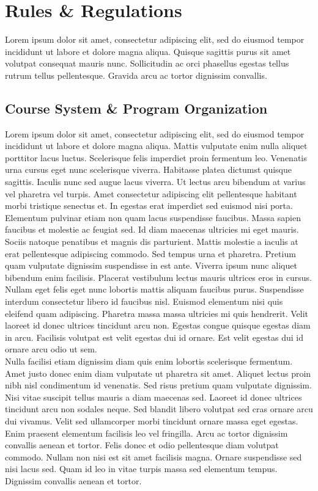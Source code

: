 \documentclass{article}
\begin{document}
\section{Rules \& Regulations}
Lorem ipsum dolor sit amet, consectetur adipiscing elit, sed do eiusmod tempor incididunt ut labore et dolore magna aliqua. Quisque sagittis purus sit amet volutpat consequat mauris nunc. Sollicitudin ac orci phasellus egestas tellus rutrum tellus pellentesque. Gravida arcu ac tortor dignissim convallis.
\subsection{Course System \& Program Organization}
Lorem ipsum dolor sit amet, consectetur adipiscing elit, sed do eiusmod tempor incididunt ut labore et dolore magna aliqua. Mattis vulputate enim nulla aliquet porttitor lacus luctus. Scelerisque felis imperdiet proin fermentum leo. Venenatis urna cursus eget nunc scelerisque viverra. Habitasse platea dictumst quisque sagittis. Iaculis nunc sed augue lacus viverra. Ut lectus arcu bibendum at varius vel pharetra vel turpis. Amet consectetur adipiscing elit pellentesque habitant morbi tristique senectus et. In egestas erat imperdiet sed euismod nisi porta. Elementum pulvinar etiam non quam lacus suspendisse faucibus. Massa sapien faucibus et molestie ac feugiat sed. Id diam maecenas ultricies mi eget mauris.\\

Sociis natoque penatibus et magnis dis parturient. Mattis molestie a iaculis at erat pellentesque adipiscing commodo. Sed tempus urna et pharetra. Pretium quam vulputate dignissim suspendisse in est ante. Viverra ipsum nunc aliquet bibendum enim facilisis. Placerat vestibulum lectus mauris ultrices eros in cursus. Nullam eget felis eget nunc lobortis mattis aliquam faucibus purus. Suspendisse interdum consectetur libero id faucibus nisl. Euismod elementum nisi quis eleifend quam adipiscing. Pharetra massa massa ultricies mi quis hendrerit. Velit laoreet id donec ultrices tincidunt arcu non. Egestas congue quisque egestas diam in arcu. Facilisis volutpat est velit egestas dui id ornare. Est velit egestas dui id ornare arcu odio ut sem.\\

Nulla facilisi etiam dignissim diam quis enim lobortis scelerisque fermentum. Amet justo donec enim diam vulputate ut pharetra sit amet. Aliquet lectus proin nibh nisl condimentum id venenatis. Sed risus pretium quam vulputate dignissim. Nisi vitae suscipit tellus mauris a diam maecenas sed. Laoreet id donec ultrices tincidunt arcu non sodales neque. Sed blandit libero volutpat sed cras ornare arcu dui vivamus. Velit sed ullamcorper morbi tincidunt ornare massa eget egestas. Enim praesent elementum facilisis leo vel fringilla. Arcu ac tortor dignissim convallis aenean et tortor. Felis donec et odio pellentesque diam volutpat commodo. Nullam non nisi est sit amet facilisis magna. Ornare suspendisse sed nisi lacus sed. Quam id leo in vitae turpis massa sed elementum tempus. Dignissim convallis aenean et tortor.\\
\end{document}
